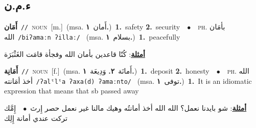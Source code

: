\documentclass[10pt,a4paper,twoside]{article} %
\begin{document}
\begin{multicols}{2}
\vspace{-3mm}
\subsection*{\color{blue}\foreignlanguage{arabic}{ء.م.ن}\color{blue}{}} 

{\setlength\topsep{0pt}\textbf{\foreignlanguage{arabic}{أَمَان}}\ {\color{gray}\texttt{//}\color{black}}\ \textsc{noun}\ [m.]\ \color{gray}(msa. \foreignlanguage{arabic}{أَمان}~\foreignlanguage{arabic}{\textbf{١.}})\color{black}\ \textbf{1.}~safety  \textbf{2.}~security\ \ $\bullet$\ \ \textsc{ph.} \color{gray} \foreignlanguage{arabic}{بأمَان الله}\color{black}\ {\color{gray}\texttt{/{\sffamily biʔamaːn ʔillaː}/}\color{black}}\ \color{gray} (msa. \foreignlanguage{arabic}{بسلام}~\foreignlanguage{arabic}{\textbf{١.}})\color{black}\ \textbf{1.}~peacefully\  \begin{flushright}\color{gray}\foreignlanguage{arabic}{\textbf{\underline{\foreignlanguage{arabic}{أمثلة}}}: كُنّا قاعدين بأمان الله وفجأة قامَت الغَثْبَرَة}\end{flushright}\color{black}} \vspace{2mm}

{\setlength\topsep{0pt}\textbf{\foreignlanguage{arabic}{أَمَانِة}}\ {\color{gray}\texttt{//}\color{black}}\ \textsc{noun}\ [f.]\ \color{gray}(msa. \foreignlanguage{arabic}{أَمانَة}~\foreignlanguage{arabic}{\textbf{٢.}}  \foreignlanguage{arabic}{وَدِيعَة}~\foreignlanguage{arabic}{\textbf{١.}})\color{black}\ \textbf{1.}~deposit  \textbf{2.}~honesty\ \ $\bullet$\ \ \textsc{ph.} \color{gray} \foreignlanguage{arabic}{الله أخذ أمَانته}\color{black}\ {\color{gray}\texttt{/{\sffamily ʔalˤlˤa ʔaxa(d) ʔamaːnto}/}\color{black}}\ \color{gray} (msa. \foreignlanguage{arabic}{توفى}~\foreignlanguage{arabic}{\textbf{١.}})\color{black}\ \textbf{1.}~It is an idiomatic expression that means that sb passed away\  \begin{flushright}\color{gray}\foreignlanguage{arabic}{\textbf{\underline{\foreignlanguage{arabic}{أمثلة}}}: شو بايدنا نعمل؟ الله الله أخذ أمانتُه وهيك مالنا غير نعمل حصر إِرث\ $\bullet$\ \  إِمَّك تركت عندي أمانة إِلِك}\end{flushright}\color{black}} \vspace{2mm}


\end{multicols}
\end{document}

